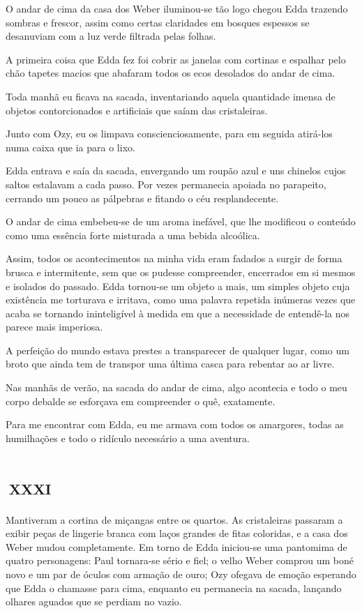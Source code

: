 O andar de cima da casa dos Weber iluminou-se tão logo chegou Edda trazendo sombras e frescor, assim como certas claridades em bosques espessos se desanuviam com a luz verde filtrada pelas folhas.

A primeira coisa que Edda fez foi cobrir as janelas com cortinas e espalhar pelo chão tapetes macios que abafaram todos os ecos desolados do andar de cima.

Toda manhã eu ficava na sacada, inventariando aquela quantidade imensa de objetos contorcionados e artificiais que saíam das cristaleiras.

Junto com Ozy, eu os limpava conscienciosamente, para em seguida atirá-los numa caixa que ia para o lixo.

Edda entrava e saía da sacada, envergando um roupão azul e uns chinelos cujos saltos estalavam a cada passo. Por vezes permanecia apoiada no parapeito, cerrando um pouco as pálpebras e fitando o céu resplandecente.

O andar de cima embebeu-se de um aroma inefável, que lhe modificou o conteúdo como uma essência forte misturada a uma bebida alcoólica.

Assim, todos os acontecimentos na minha vida eram fadados a surgir de forma brusca e intermitente, sem que os pudesse compreender, encerrados em si mesmos e isolados do passado. Edda tornou-se um objeto a mais, um simples objeto cuja existência me torturava e irritava, como uma palavra repetida inúmeras vezes que acaba se tornando ininteligível à medida em que a necessidade de entendê-la nos parece mais imperiosa.

A perfeição do mundo estava prestes a transparecer de qualquer lugar, como um broto que ainda tem de transpor uma última casca para rebentar ao ar livre.

Nas manhãs de verão, na sacada do andar de cima, algo acontecia e todo o meu corpo debalde se esforçava em compreender o quê, exatamente.

Para me encontrar com Edda, eu me armava com todos os amargores, todas as humilhações e todo o ridículo necessário a uma aventura.


\chapter*{\small{}\,\Large\centering\textsc{xxxi}\,\small{}}

Mantiveram a cortina de miçangas entre os quartos. As cristaleiras passaram a exibir peças de lingerie branca com laços grandes de fitas coloridas, e a casa dos Weber mudou completamente. Em torno de Edda iniciou-se uma pantomima de quatro personagens: Paul tornara-se sério e fiel; o velho Weber comprou um boné novo e um par de óculos com armação de ouro; Ozy ofegava de emoção esperando que Edda o chamasse para cima, enquanto eu permanecia na sacada, lançando olhares aguados que se perdiam no vazio.

